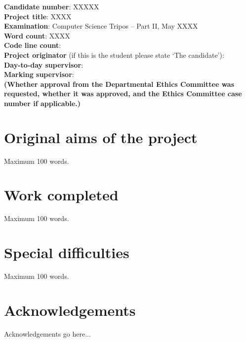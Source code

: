 \documentclass[12pt,a4paper,twoside,openright]{report}
\begin{document}
\textbf{Candidate number}: XXXXX \\
\textbf{Project title}: XXXX \\
\textbf{Examination}: Computer Science Tripos -- Part II, May XXXX  \\
\textbf{Word count}: XXXX \\
\textbf{Code line count}: \\
\textbf{Project originator} (if this is the student please state `The candidate'):  \\
\textbf{Day-to-day supervisor}: \\
\textbf{Marking supervisor}: \\
\textbf{(Whether approval from the Departmental Ethics Committee was requested, whether it was approved, and the Ethics Committee case number if applicable.)} \\




\section*{Original aims of the project}

Maximum 100 words.


\section*{Work completed}

Maximum 100 words.

\section*{Special difficulties}

Maximum 100 words.

\section*{Acknowledgements}

Acknowledgements go here...


\tableofcontents
\end{document}
